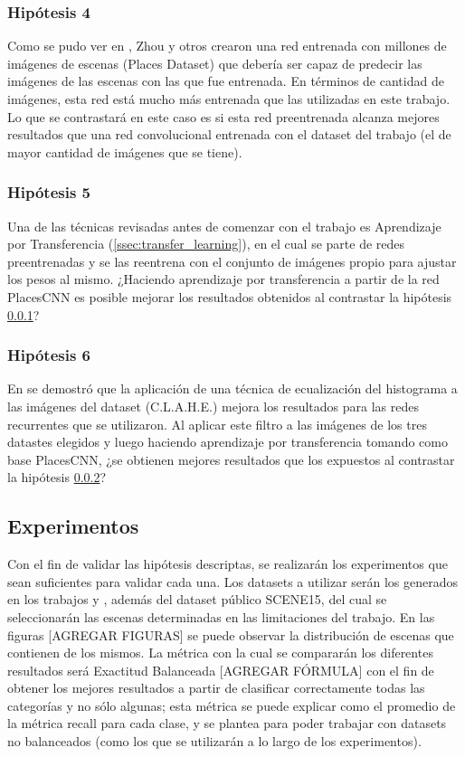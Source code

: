 \subsubsection{Hipótesis 4} \label{sssec:hipotesis4}
Como se pudo ver en \cite{learning_deep_features}, Zhou y otros crearon una red entrenada con millones de imágenes de escenas (Places Dataset) que debería ser capaz de predecir las imágenes de las escenas con las que fue entrenada. En términos de cantidad de imágenes, esta red está mucho más entrenada que las utilizadas en este trabajo. Lo que se contrastará en este caso es si esta red preentrenada alcanza mejores resultados que una red convolucional entrenada con el dataset del trabajo \cite{vision_based_real_estate_price_estimation} (el de mayor cantidad de imágenes que se tiene).

\subsubsection{Hipótesis 5} \label{sssec:hipotesis5}
Una de las técnicas revisadas antes de comenzar con el trabajo es Aprendizaje por Transferencia (\ref{ssec:transfer_learning}), en el cual se parte de redes preentrenadas y se las reentrena con el conjunto de imágenes propio para ajustar los pesos al mismo. ¿Haciendo aprendizaje por transferencia a partir de la red PlacesCNN es posible mejorar los resultados obtenidos al contrastar la hipótesis \ref{sssec:hipotesis4}?

\subsubsection{Hipótesis 6} \label{sssec:hipotesis6}
En \cite{lstm_real_estate} se demostró que la aplicación de una técnica de ecualización del histograma a las imágenes del dataset (C.L.A.H.E.) mejora los resultados para las redes recurrentes que se utilizaron. Al aplicar este filtro a las imágenes de los tres datastes elegidos y luego haciendo aprendizaje por transferencia tomando como base PlacesCNN, ¿se obtienen mejores resultados que los expuestos al contrastar la hipótesis \ref{sssec:hipotesis5}?


\subsection{Experimentos}
Con el fin de validar las hipótesis descriptas, se realizarán los experimentos que sean suficientes para validar cada una. Los datasets a utilizar serán los generados en los trabajos \cite{vision_based_real_estate_price_estimation} y \cite{lstm_real_estate}, además del dataset público SCENE15, del cual se seleccionarán las escenas determinadas en las limitaciones del trabajo. En las figuras [AGREGAR FIGURAS] se puede observar la distribución de escenas que contienen de los mismos. La métrica con la cual se compararán los diferentes resultados será Exactitud Balanceada [AGREGAR FÓRMULA] con el fin de obtener los mejores resultados a partir de clasificar correctamente todas las categorías y no sólo algunas; esta métrica se puede explicar como el promedio de la métrica recall para cada clase, y se plantea para poder trabajar con datasets no balanceados (como los que se utilizarán a lo largo de los experimentos).

